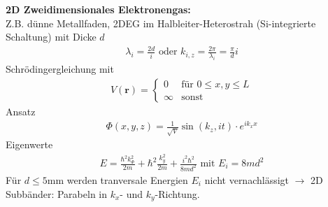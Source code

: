 \begin{itemize}
    \textbf{2D Zweidimensionales Elektronengas:} \\
    Z.B. dünne Metallfaden, 2DEG im Halbleiter-Heterostrah (Si-integrierte Schaltung) mit Dicke $d$
    \begin{align*}
        \lambda_i = \frac{2d}{i} \text{ oder } k_{i,z} = \frac{2\pi}{\lambda_i} = \frac{\pi}{d}i
    \end{align*}
    Schrödingergleichung mit
    \begin{align*}
        V(\textbf{r}) = \begin{cases}
                0 &\text{für } 0 \leq x,y \leq L\\
                \infty & \text{sonst}
            \end{cases}
    \end{align*}
    Ansatz 
    \begin{align*}
        \Phi(x,y,z) = \frac{1}{\sqrt{V}}\sin(k_z,it)\cdot e^{i k_x x}
    \end{align*}
    Eigenwerte
    \begin{align*}
        E = \frac{\hbar^2 k_{\Phi}^2}{2m} + \hbar^2 \frac{k_y^2}{2m} + \frac{i^2\hbar^2}{8md^2} \text{ mit } E_i = 8md^2
    \end{align*}
    Für $d\leq 5$mm werden tranversale Energien $E_i$ nicht vernachlässigt $\rightarrow$ 2D Subbänder: Parabeln in $k_x$- und $k_y$-Richtung.
    

\end{itemize}
